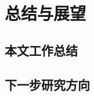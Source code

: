 \chapter{总结与展望}\label{chap:Summary} 

\section{本文工作总结}\label{sec:result_analysis}
\section{下一步研究方向}\label{sec:TODOs}
